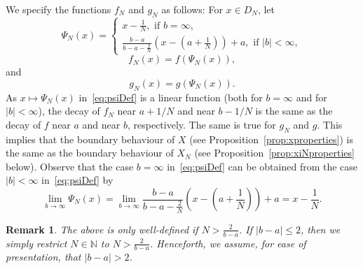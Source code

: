 \documentclass[11pt]{amsart}
\newtheorem{remark}[theorem]{Remark}
\newcommand{\DDN}{D_{N}}
\begin{document}
{We specify the functions $f_{N}$ and $g_{N}$ as follows: For $x \in \DDN$, let
\begin{equation}\label{eq:psiDef}
\Psi_{N}(x) = 
\begin{cases}
x - \frac{1}{N}, \text{ if } b = \infty,\\
\frac{b-a}{b-a-\frac{2}{N}} \left( x - \left( a + \frac{1}{N} \right) \right) + a, \text{ if } |b| < \infty,
\end{cases}
\end{equation}
\begin{equation*}
f_{N}(x) = f \left( \Psi_{N}(x) \right),
\end{equation*}
and
\begin{equation*}
g_{N}(x) = g \left( \Psi_{N}(x) \right).
\end{equation*}
As $x \mapsto \Psi_{N}(x)$ in~\eqref{eq:psiDef} is a linear function (both for $b=\infty$ and for $|b|<\infty$), the decay of $f_{N}$ near $a + 1/N$ and near $b - 1/N$ is the same as the decay of $f$ near $a$ and near $b$, respectively. The same is true for $g_{N}$ and $g$. This implies that the boundary behaviour of $X$ (see Proposition~\ref{prop:xproperties}) is the same as the boundary behaviour of $X_{N}$ (see Proposition~\ref{prop:xiNproperties} below). Observe that the case $b=\infty$ in~\eqref{eq:psiDef} can be obtained from the case $|b|<\infty$ in~\eqref{eq:psiDef} by
\begin{equation*}
\lim_{b \to \infty} \Psi_{N}(x) = \lim_{b \to \infty} \frac{b-a}{b-a-\frac{2}{N}} \left( x - \left( a + \frac{1}{N} \right) \right) + a = x - \frac{1}{N}.
\end{equation*}
\begin{remark}
The above is only well-defined if $N > \frac{2}{b-a}$. If $|b-a| \leq 2$, then we simply restrict $N \in \mathbb{N}$ to $N > \frac{2}{b-a}$. Henceforth, we assume, for ease of presentation, that $|b-a| > 2$.
\end{remark}

}
\end{document}
